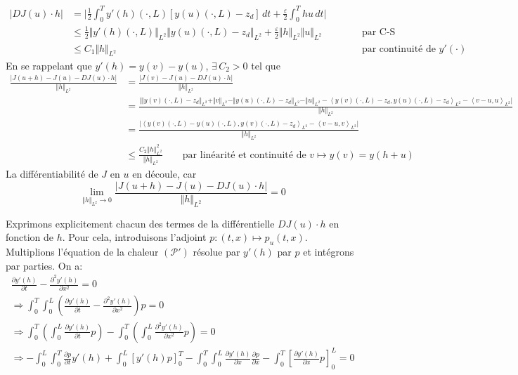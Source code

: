 \documentclass[
	french,
	11pt, %
]{fphw}
\begin{document}
\begin{align*}
	\vert DJ(u)\cdot h \vert &= \bigg\rvert \frac{1}{2} \int_0^T y'(h)(\cdot,L) \left[y(u)(\cdot,L) - z_d\right]\,dt + \frac{\varepsilon}{2} \int_0^T h u\,dt \bigg\rvert \\
	&\leq \frac{1}{2} \Vert y'(h)(\cdot,L) \Vert_{L^2} \Vert y(u)(\cdot,L) - z_d \Vert_{L^2} + \frac{\varepsilon}{2} \Vert h \Vert_{L^2} \Vert u \Vert_{L^2} &&\qquad \text{par C-S} \\
	&\leq C_1 \Vert h \Vert_{L^2} &&\qquad \text{par continuité de $y'(\cdot)$}
\end{align*}
En se rappelant que $y'(h) = y(v)-y(u)$, $\exists \, C_2 >0$ tel que 
% 
\begin{align*}
	\frac{\vert J(u+h) - J(u) - DJ(u)\cdot h \vert}{\Vert h \Vert_{L^2} } &= \frac{\vert J(v) - J(u) - DJ(u)\cdot h \vert}{\Vert h \Vert_{L^2} } \\
	&= \frac{ \big\rvert \Vert y(v)(\cdot,L)-z_d \Vert_{L^2} + \Vert v \Vert_{L^2} - \Vert y(u)(\cdot,L)-z_d \Vert_{L^2} - \Vert u \Vert_{L^2} - \left\langle y(v)(\cdot,L)-z_d, y(u)(\cdot,L)-z_d \right\rangle_{L^2} - \left\langle v-u, u \right\rangle_{L^2} \big\rvert}{\Vert h \Vert_{L^2}} \\
	&= \frac{ \big\rvert \left\langle y(v)(\cdot,L)-y(u)(\cdot,L), y(v)(\cdot,L)-z_d \right\rangle_{L^2} - \left\langle v-u, v \right\rangle_{L^2} \big\rvert}{\Vert h \Vert_{L^2}} \\
	&\leq  \frac{ C_2 \Vert h \Vert^2_{L^2}}{\Vert h \Vert_{L^2}} \qquad \text{par linéarité et continuité de $v \mapsto y(v)=y(h+u)$}
\end{align*}
La différentiabilité de $J$ en $u$ en découle, car
$$
\lim_{\Vert h \Vert_{L^2} \rightarrow 0} \frac{\vert J(u+h) - J(u) - DJ(u)\cdot h \vert}{\Vert h \Vert_{L^2} } = 0 
$$


Exprimons explicitement chacun des termes de la différentielle $DJ(u)\cdot h$ en fonction de $h$. Pour cela, introduisons l'adjoint $p:(t,x) \mapsto p_u(t,x)$. Multiplions l'équation de la chaleur $(\mathcal{P}')$ résolue par $y'(h)$ par $p$ et intégrons par parties. On a:
\begin{align*}
	\frac{\partial y'(h)}{\partial t} - \frac{\partial^2 y'(h)}{\partial x^2} = 0 \\
	\Longrightarrow \int_0^T \int_0^L \left( \frac{\partial y'(h)}{\partial t} - \frac{\partial^2 y'(h)}{\partial x^2} \right) p = 0 \\
	\Longrightarrow \int_0^T \left( \int_0^L \frac{\partial y'(h)}{\partial t} p \right) - \int_0^T \left( \int_0^L \frac{\partial^2 y'(h)}{\partial x^2}p \right) = 0 \\
	\Longrightarrow - \int_0^L \int_0^T \frac{\partial p}{\partial t} y'(h) + \int_0^L \left[ y'(h)p \right]_0^T- \int_0^T \int_0^L \frac{\partial y'(h)}{\partial x} \frac{\partial p}{\partial x} - \int_0^T \left[ \frac{\partial y'(h)}{\partial x}p \right]_0^L  = 0 \\
\end{align*}
\end{document}
